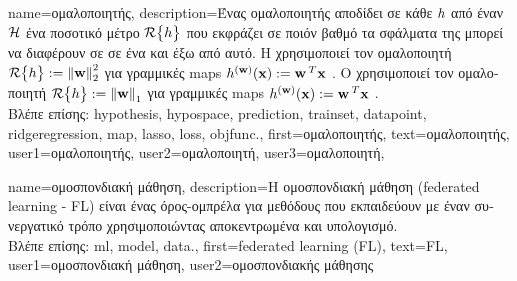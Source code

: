 {name={\foreignlanguage{greek}{ομαλοποιητής}}, 
	description={\foreignlanguage{greek}{Ένας ομαλοποιητής αποδίδει σε κάθε}  
		 $h$ \foreignlanguage{greek}{από έναν}  $\mathcal{H}$ 
		\foreignlanguage{greek}{ένα ποσοτικό μέτρο $\mathcal{R}\big\{ h \big\}$ που εκφράζει σε ποιόν βαθμό τα σφάλματα} 
		 \foreignlanguage{greek}{της μπορεί να διαφέρουν σε}  
		\foreignlanguage{greek}{σε ένα}  \foreignlanguage{greek}{και έξω από αυτό. Η} 
		 \foreignlanguage{greek}{χρησιμοποιεί τον ομαλοποιητή 
		$\mathcal{R}\big\{ h \big\} := \left\Vert {{\bf w}} \right\Vert_{2}^{2}$ για γραμμικές} \gls{map}s  
		$h^{({\bf w})}({\bf x}) := {\bf w}\,^{T} {\bf x}$ \cite[\foreignlanguage{greek}{Κεφ.} 3]{MLBasics}. 
		\foreignlanguage{greek}{Ο}  \foreignlanguage{greek}{χρησιμοποιεί τον ομαλοποιητή 
		$\mathcal{R}\big\{ h \big\} := \left\Vert {{\bf w}} \right\Vert_{1}$ για γραμμικές} \gls{map}s  
		$h^{({\bf w})}({\bf x}) := {\bf w}\,^{T} {\bf x}$ \cite[\foreignlanguage{greek}{Κεφ.} 3]{MLBasics}.\\
		\foreignlanguage{greek}{Βλέπε επίσης:} \gls{hypothesis}, \gls{hypospace}, \gls{prediction}, \gls{trainset}, \gls{datapoint}, 
		\gls{ridgeregression}, \gls{map}, \gls{lasso}, \gls{loss}, \gls{objfunc}.},
	first={\foreignlanguage{greek}{ομαλοποιητής}},
	text={\foreignlanguage{greek}{ομαλοποιητής}},
	user1={\foreignlanguage{greek}{ομαλοποιητής}}, %
 	user2={\foreignlanguage{greek}{ομαλοποιητή}}, %
 	user3={\foreignlanguage{greek}{ομαλοποιητή}}, %
}

{name={\foreignlanguage{greek}{ομοσπονδιακή μάθηση}}, 
	description={\foreignlanguage{greek}{Η ομοσπονδιακή μάθηση} 
		(federated learning - FL) \foreignlanguage{greek}{είναι ένας όρος-ομπρέλα για μεθόδους}  
		\foreignlanguage{greek}{που εκπαι\-δεύ\-ουν}  \foreignlanguage{greek}{με έναν συνεργατικό
		τρόπο χρησιμοποιώντας αποκεντρωμένα}  \foreignlanguage{greek}{και υπολογισμό}.\\
		\foreignlanguage{greek}{Βλέπε επίσης:} \gls{ml}, \gls{model}, \gls{data}.},
	first={federated learning (FL)},
	text={FL}, 
	user1={\foreignlanguage{greek}{ομοσπονδιακή μάθηση}}, %
  	user2={\foreignlanguage{greek}{ομοσπονδιακής μάθησης}} %
}

